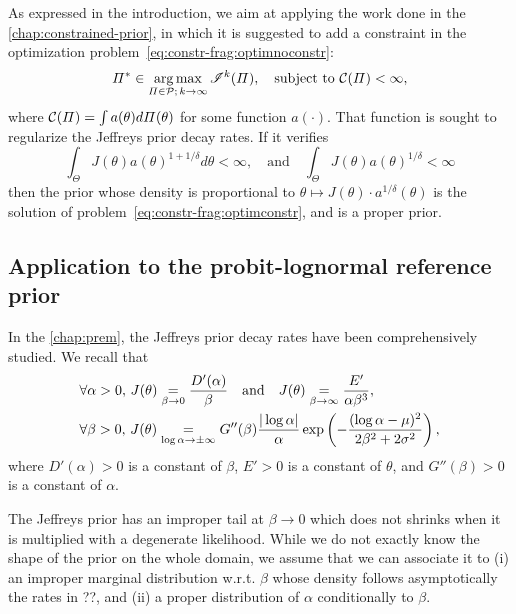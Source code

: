 As expressed in the introduction, we aim at applying the work done in the \cref{chap:constrained-prior}, in which it is suggested to add a constraint in the optimization problem~\eqref{eq:constr-frag:optimnoconstr}:
\begin{equation}\label{eq:constr-frag:optimconstr}
    \varPi^\ast\in\operatorname*{arg\,max}_{\varPi\in\mathcal{P};\,k\rightarrow\infty}\mathscr{I}^k(\varPi),\quad\text{subject to\ }\mathcal{C}(\varPi)<\infty,
\end{equation}
where $\mathcal{C}(\varPi)= \int a(\theta)d\varPi(\theta)$ for some function $a(\cdot)$.
That function is sought to regularize the Jeffreys prior decay rates. If it verifies
    \begin{equation}\label{eq:constr-frag:inta}
        \int_\Theta J(\theta)a(\theta)^{1+1/\delta}d\theta <\infty, \quad\text{and} \quad \int_\Theta J(\theta)a(\theta)^{1/\delta}<\infty 
    \end{equation}
then the prior whose density is proportional to $\theta\mapsto J(\theta)\cdot a^{1/\delta}(\theta)$ is the solution of problem~\eqref{eq:constr-frag:optimconstr}, and is a proper prior.


\subsection{Application to the probit-lognormal reference prior}


In the \cref{chap:prem}, the Jeffreys prior decay rates have been comprehensively studied.
We recall that
    \begin{align}\label{eq:constr-frag:decaysJbeta}
        &\forall\alpha>0,\, J(\theta) \overset{}{\underset{\beta\rightarrow0}{=}}\frac{D'(\alpha)}{\beta}\quad\text{and}\quad J(\theta)\overset{}{\underset{\beta\rightarrow\infty}{=}}\frac{E'}{\alpha\beta^3}, \\
        &\forall\beta>0,\,J(\theta) \overset{}{\underset{\log\alpha\rightarrow\pm\infty}{=}}G''(\beta)\frac{|\log\alpha|}{\alpha}\exp\left(-\frac{(\log\alpha-\mu)^2}{2\beta^2+2\sigma^2}\right),
    \end{align}
where $D'(\alpha)>0$ is a constant of $\beta$, $E'>0$ is a constant of $\theta$, and $G''(\beta)>0$ is a constant of $\alpha$.

The Jeffreys prior has an improper tail at $\beta\to0$ which does not shrinks when it is multiplied with a degenerate likelihood.
While we do not exactly know the shape of the prior on the whole domain, we assume that we can associate it to (i) an improper marginal distribution w.r.t. $\beta$ whose density follows asymptotically the rates in ??, and (ii) a proper distribution of $\alpha$ conditionally to $\beta$.



